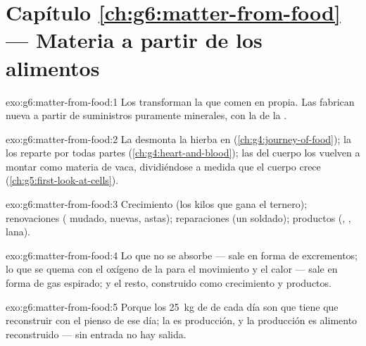 \section*{Capítulo \ref{ch:g6:matter-from-food} --- Materia a partir de los alimentos}

\begin{solution}{exo:g6:matter-from-food:1}
Los  transforman la  que comen en  propia. Las  fabrican  nueva a
partir de suministros puramente minerales, con la  de la .
\end{solution}

\begin{solution}{exo:g6:matter-from-food:2}
La  desmonta la hierba en 
(\cref{ch:g4:journey-of-food}); la  los reparte por todas partes
(\cref{ch:g4:heart-and-blood}); las  del cuerpo los vuelven a
montar como materia de vaca, dividiéndose a medida que el cuerpo crece
(\cref{ch:g5:first-look-at-cells}).
\end{solution}

\begin{solution}{exo:g6:matter-from-food:3}
Crecimiento (los kilos que gana el ternero); renovaciones ( mudado,
 nuevas, astas); reparaciones (un  soldado); productos
(, , lana).
\end{solution}

\begin{solution}{exo:g6:matter-from-food:4}
Lo que no se absorbe --- sale en forma de excrementos; lo que se quema
con el oxígeno de la  para el movimiento y el calor --- sale
en forma de gas espirado; y el resto, construido como crecimiento y
productos.
\end{solution}

\begin{solution}{exo:g6:matter-from-food:5}
Porque los \qty{25}{kg} de  de cada día son  que
tiene que reconstruir con el pienso de ese día; la  es producción,
y la producción es alimento reconstruido --- sin entrada no hay salida.
\end{solution}

